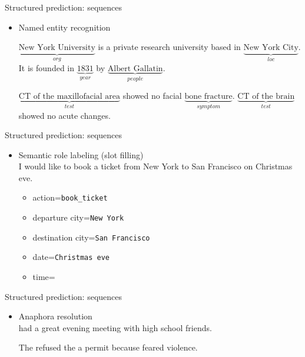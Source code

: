 \documentclass[usenames,dvipsnames,notes,11pt,aspectratio=169]{beamer}
\begin{document}
\begin{frame}
    {Structured prediction: sequences}
    \begin{itemize}
        \item Named entity recognition\\
        {
            $\underbrace{\text{New York University}}_{{\textstyle org}}$ is a private research university based in $\underbrace{\text{New York City}}_{{\textstyle loc}}$.
            It is founded in $\underbrace{\text{1831}}_{{\textstyle year}}$ by $\underbrace{\text{Albert Gallatin}}_{{\textstyle people}}$.\par
            \pause
            $\underbrace{\text{CT of the maxillofacial area}}_{{\textstyle test}}$ showed no facial $\underbrace{\text{bone fracture}}_{{\textstyle symptom}}$.
            $\underbrace{\text{CT of the brain}}_{{\textstyle test}}$ showed no acute changes.\par
        }
    \end{itemize}
\end{frame}

\begin{frame}
    {Structured prediction: sequences}
    \begin{itemize}
        \item Semantic role labeling (slot filling)\\
            \medskip
            I would like to book a ticket from New York to San Francisco on Christmas eve.
            \begin{itemize}
                \itemsep1ex
                \item[]action=\texttt{book\_ticket}
                \item[]departure city=\texttt{New York}
                \item[]destination city=\texttt{San Francisco}
                \item[]date=\texttt{Christmas eve}
                \item[]time=
            \end{itemize}
    \end{itemize}
\end{frame}

\begin{frame}
    {Structured prediction: sequences}
    \begin{itemize}
        \item Anaphora resolution\\[1em]
                 had a great evening meeting with  high school friends.\par
                \pause\medskip
                The  refused the  a permit because  feared violence.\par
    \end{itemize}
\end{frame}
\end{document}
